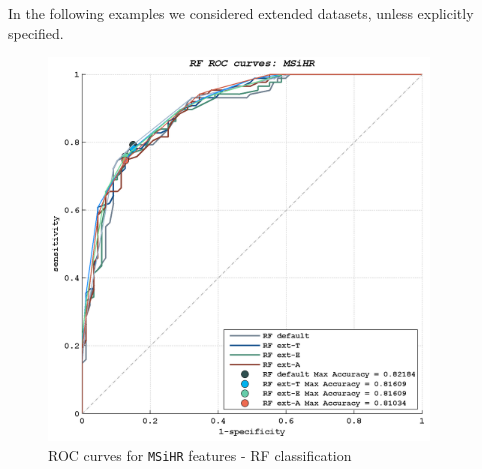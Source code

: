 
In the following examples we considered extended datasets, unless explicitly specified.

\clearpage


\begin{figure}[!ht]
    \includegraphics[width=0.90\textwidth]{./images/Ch6/Fig3/RF_ROC_MSiHR_crop.png}
    \caption{ROC curves for \texttt{MSiHR} features - RF classification}
    \label{ch6:fig5}
\end{figure}


\vspace{2.0cm}

